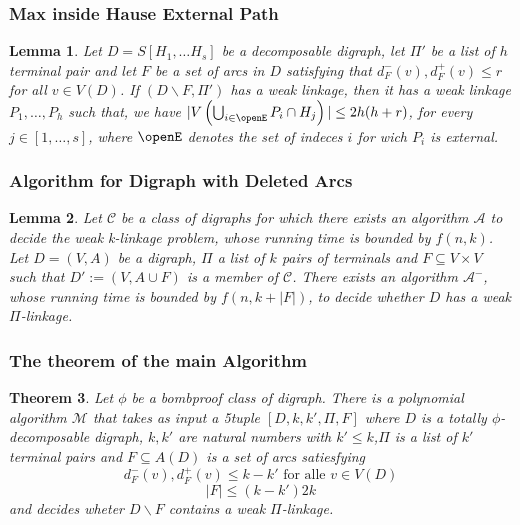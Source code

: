 \documentclass{beamer}
\newtheorem{thm}{Theorem}[section]
\newtheorem{lemma}[thm]{Lemma}
\begin{document}
\begin{frame}
    \frametitle{Max inside Hause External Path}
    \begin{lemma}
        Let $D=S[H_1,\dots H_s]$ be a decomposable digraph, let $\Pi'$ be a list of $h$ terminal pair and let $F$ be a set of arcs in $D$ satisfying that $d^-_F(v),d^+_F(v) \leq r$ for all $v \in V(D)$. If $(D\backslash F,\Pi')$ has a weak linkage, then it has a weak linkage $P_1,\dots , P_h$ such that, we have $|V\left( \bigcup_{i\in \openE} P_i\cap H_j \right)|\leq 2h(h+r)$, for every $j\in [1,\dots,s]$, where $\openE$ denotes the set of indeces $i$ for wich $P_i$ is external.
    \end{lemma}
\end{frame}
\begin{frame}
    \frametitle{Algorithm for Digraph with Deleted Arcs}
    \begin{lemma}
        Let $\mathcal{C}$ be a class of digraphs for which there exists an algorithm $\mathcal{A}$ to decide the weak k-linkage problem, whose running time is bounded by $f(n,k)$. Let $D=(V,A)$ be a digraph, $\Pi$ a list of $k$ pairs of terminals and $F\subseteq V\times V$ such that $D':= (V,A\cup F)$ is a member of $\mathcal{C}$. There exists an algorithm  $\mathcal{A}^-$, whose running time is bounded by $f(n,k+|F|)$, to decide whether $D$ has a weak $\Pi$-linkage.
    \end{lemma}
\end{frame}
\begin{frame}
    \frametitle{The theorem of the main Algorithm}
    \begin{thm}
        Let $\phi$ be a bombproof class of digraph. There is a polynomial algorithm $\mathcal{M}$ that takes as input a 5tuple $[D,k,k',\Pi,F]$ where $D$ is a totally $\phi$-decomposable digraph, $k,k'$ are natural numbers with $k'\leq k$,$\Pi$ is a list of $k'$ terminal pairs and $F\subseteq A(D)$ is a set of arcs satiesfying 
        \begin{equation}
            d_F^-(v),d_F^+(v)\leq k-k' \text{ for alle } v\in V(D)
        \end{equation}
        \begin{equation*}
            |F|\leq (k-k')2k
        \end{equation*}
        and decides wheter $D\backslash F$ contains a weak $\Pi$-linkage.
    \end{thm}
\end{frame}
\end{document}
